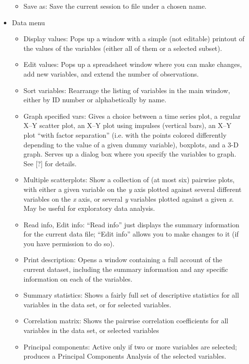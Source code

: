 \begin{itemize}
\begin{itemize}
  \item \textsf{Save as}: Save the current session to file under a
    chosen name.
	    
  \end{itemize}


\item \textsf{Data menu}
  \begin{itemize}
  \item \textsf{Display values}: Pops up a window with a simple (not
    editable) printout of the values of the variables (either all of
    them or a selected subset).
  \item \textsf{Edit values}: Pops up a spreadsheet window where you
    can make changes, add new variables, and extend the number of
    observations.
	      
  \item \textsf{Sort variables}: Rearrange the listing of variables in
    the main window, either by ID number or alphabetically by name.
	      
  \item \textsf{Graph specified vars}: Gives a choice between a time
    series plot, a regular X--Y scatter plot, an X--Y plot using
    impulses (vertical bars), an X--Y plot ``with factor separation''
    (i.e. with the points colored differently depending to the value
    of a given dummy variable), boxplots, and a 3-D graph. Serves up a
    dialog box where you specify the variables to graph. See [?]  for
    details.
  \item \textsf{Multiple scatterplots}: Show a collection of (at most
    six) pairwise plots, with either a given variable on the \emph{y}
    axis plotted against several different variables on the \emph{x}
    axis, or several \emph{y} variables plotted against a given
    \emph{x}. May be useful for exploratory data analysis.
  \item \textsf{Read info}, \textsf{Edit info}: ``Read info'' just
    displays the summary information for the current data file; ``Edit
    info'' allows you to make changes to it (if you have permission to
    do so).
  \item \textsf{Print description}: Opens a window containing a full
    account of the current dataset, including the summary information
    and any specific information on each of the variables.
  \item \textsf{Summary statistics}: Shows a fairly full set of
    descriptive statistics for all variables in the data set, or for
    selected variables.
  \item \textsf{Correlation matrix}: Shows the pairwise correlation
    coefficients for all variables in the data set, or selected
    variables
  \item \textsf{Principal components}: Active only if two or more
    variables are selected; produces a Principal Components Analysis
    of the selected variables.
	      

\end{itemize}
\end{itemize}

